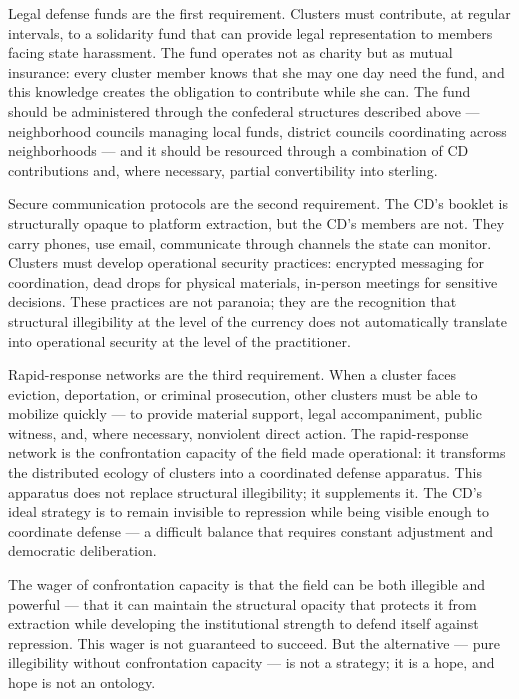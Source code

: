 Legal defense funds are the first requirement. Clusters must contribute, at regular intervals, to a solidarity fund that can provide legal representation to members facing state harassment. The fund operates not as charity but as mutual insurance: every cluster member knows that she may one day need the fund, and this knowledge creates the obligation to contribute while she can. The fund should be administered through the confederal structures described above — neighborhood councils managing local funds, district councils coordinating across neighborhoods — and it should be resourced through a combination of CD contributions and, where necessary, partial convertibility into sterling.

Secure communication protocols are the second requirement. The CD's booklet is structurally opaque to platform extraction, but the CD's members are not. They carry phones, use email, communicate through channels the state can monitor. Clusters must develop operational security practices: encrypted messaging for coordination, dead drops for physical materials, in-person meetings for sensitive decisions. These practices are not paranoia; they are the recognition that structural illegibility at the level of the currency does not automatically translate into operational security at the level of the practitioner.

Rapid-response networks are the third requirement. When a cluster faces eviction, deportation, or criminal prosecution, other clusters must be able to mobilize quickly — to provide material support, legal accompaniment, public witness, and, where necessary, nonviolent direct action. The rapid-response network is the confrontation capacity of the field made operational: it transforms the distributed ecology of clusters into a coordinated defense apparatus. This apparatus does not replace structural illegibility; it supplements it. The CD's ideal strategy is to remain invisible to repression while being visible enough to coordinate defense — a difficult balance that requires constant adjustment and democratic deliberation.

The wager of confrontation capacity is that the field can be both illegible and powerful — that it can maintain the structural opacity that protects it from extraction while developing the institutional strength to defend itself against repression. This wager is not guaranteed to succeed. But the alternative — pure illegibility without confrontation capacity — is not a strategy; it is a hope, and hope is not an ontology.

